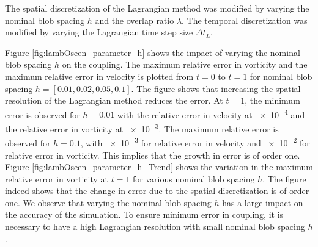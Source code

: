 The spatial discretization of the Lagrangian method was modified by varying the nominal blob spacing $h$ and the overlap ratio $\lambda$. The temporal discretization was modified by varying the Lagrangian time step size $\Delta t_L$. %





	
	
Figure \ref{fig:lambOseen_parameter_h} shows the impact of varying the nominal blob spacing $h$ on the coupling. The maximum relative error in vorticity and the maximum relative error in velocity is plotted from $t=0$ to $t=1$ for nominal blob spacing $h = [0.01,0.02,0.05,0.1]$. The figure shows that increasing the spatial resolution of the Lagrangian method reduces the error. At $t=1$, the minimum error is observed for $h=0.01$ with the relative error in velocity at \num{e-4} and the relative error in vorticity at \num{e-3}. The maximum relative error is observed for $h=0.1$, with \num{e-3} for relative error in velocity and \num{e-2} for relative error in vorticity. This implies that the growth in error is of order one. Figure \ref{fig:lambOseen_parameter_h_Trend} shows the variation in the maximum relative error in vorticity at $t=1$ for various nominal blob spacing $h$. The figure indeed shows that the change in error due to the spatial discretization is of order one. We observe that varying the nominal blob spacing $h$ has a large impact on the accuracy of the simulation. To ensure minimum error in coupling, it is necessary to have a high Lagrangian resolution with small nominal blob spacing $h$.

